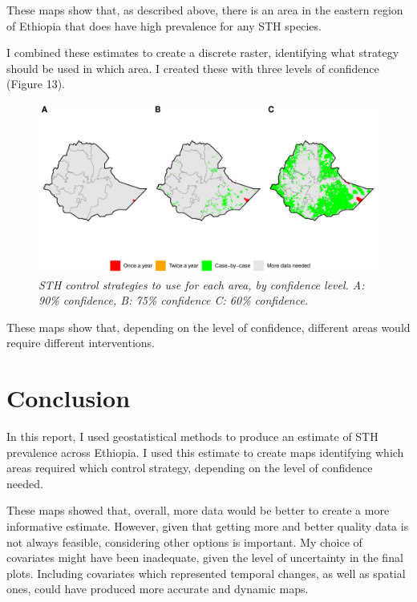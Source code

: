 \documentclass[
]{article}
\begin{document}
These maps show that, as described above, there is an area in the
eastern region of Ethiopia that does have high prevalence for any STH
species.

I combined these estimates to create a discrete raster, identifying what
strategy should be used in which area. I created these with three levels
of confidence (Figure 13).

\begin{figure}
\centering
\includegraphics{write_up_files/figure-latex/discrete.rasters-1.pdf}
\caption{\emph{STH control strategies to use for each area, by
confidence level. A: 90\% confidence, B: 75\% confidence C: 60\%
confidence.}}
\end{figure}

These maps show that, depending on the level of confidence, different
areas would require different interventions.

\newpage

\hypertarget{conclusion}{%
\section{Conclusion}\label{conclusion}}

In this report, I used geostatistical methods to produce an estimate of
STH prevalence across Ethiopia. I used this estimate to create maps
identifying which areas required which control strategy, depending on
the level of confidence needed.

These maps showed that, overall, more data would be better to create a
more informative estimate. However, given that getting more and better
quality data is not always feasible, considering other options is
important. My choice of covariates might have been inadequate, given the
level of uncertainty in the final plots. Including covariates which
represented temporal changes, as well as spatial ones, could have
produced more accurate and dynamic maps.
\end{document}
